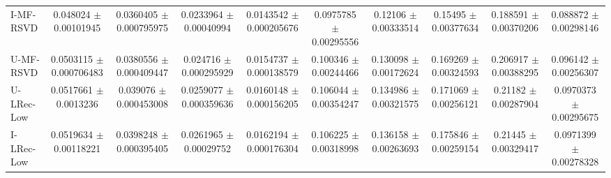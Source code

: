 \begin{table*}
{\begin{tabular}{l|cccc|cccc|c}
		 I-MF-RSVD &  \num{0.048024} $\pm$ \num{0.00101945}&\num{0.0360405} $\pm$ \num{0.000795975}&\num{0.0233964} $\pm$ \num{0.00040994}&\num{0.0143542} $\pm$ \num{0.000205676}&\num{0.0975785} $\pm$ \num{0.00295556}&\num{0.12106} $\pm$ \num{0.00333514}&\num{0.15495} $\pm$ \num{0.00377634}&\num{0.188591} $\pm$ \num{0.00370206}&\num{0.088872} $\pm$ \num{0.00298146}\\

		 U-MF-RSVD & \num{0.0503115} $\pm$ \num{0.000706483}&\num{0.0380556} $\pm$ \num{0.000409447}&\num{0.024716} $\pm$ \num{0.000295929}&\num{0.0154737} $\pm$ \num{0.000138579}&\num{0.100346} $\pm$ \num{0.00244466}&\num{0.130098} $\pm$ \num{0.00172624}&\num{0.169269} $\pm$ \num{0.00324593}&\num{0.206917} $\pm$ \num{0.00388295}&\num{0.096142} $\pm$ \num{0.00256307}\\

		U-LRec-Low &  \num{0.0517661} $\pm$ \num{0.0013236}&\num{0.039076} $\pm$ \num{0.000453008}&\num{0.0259077} $\pm$ \num{0.000359636}&\num{0.0160148} $\pm$ \num{0.000156205}&\num{0.106044} $\pm$ \num{0.00354247}&\num{0.134986} $\pm$ \num{0.00321575}&\num{0.171069} $\pm$ \num{0.00256121}&\num{0.21182} $\pm$ \num{0.00287904}&\num{0.0970373} $\pm$ \num{0.00295675}\\

		I-LRec-Low &  \num{0.0519634} $\pm$ \num{0.00118221}&\num{0.0398248} $\pm$ \num{0.000395405}&\num{0.0261965} $\pm$ \num{0.00029752}&\num{0.0162194} $\pm$ \num{0.000176304}&\num{0.106225} $\pm$ \num{0.00318998}&\num{0.136158} $\pm$ \num{0.00263693}&\num{0.175846} $\pm$ \num{0.00259154}&\num{0.21445} $\pm$ \num{0.00329417}&\num{0.0971399} $\pm$ \num{0.00278328} \\


		


\end{tabular}}
\end{table*}
